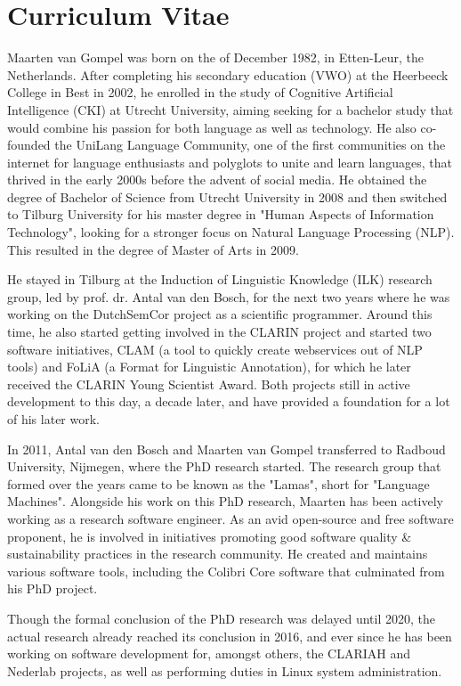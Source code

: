 \chapter*{Curriculum Vitae}

Maarten van Gompel was born on the  of December 1982, in Etten-Leur,
the Netherlands. After completing his secondary education (VWO) at the
Heerbeeck College in Best in 2002, he enrolled in the study of
Cognitive Artificial Intelligence (CKI) at Utrecht University, aiming
seeking for a bachelor study that would combine his
passion for both language as well as technology. He also
co-founded the UniLang Language Community, one of the first communities on the
internet for language enthusiasts and polyglots to unite and learn languages,
that thrived in the early 2000s before the advent of social media. He obtained
the degree of Bachelor of Science from Utrecht University in 2008 and then
switched to Tilburg University for his master degree in "Human Aspects of
Information Technology", looking for a stronger focus on Natural Language
Processing (NLP).  This resulted in the degree of Master of Arts in 2009.

He stayed in Tilburg at the Induction of Linguistic Knowledge (ILK) research
group, led by prof. dr. Antal van den Bosch, for the next two years where he was working on
the DutchSemCor project as a scientific programmer. Around this time, he also
started getting involved in the CLARIN project and started two software
initiatives, CLAM (a tool to quickly create webservices out of NLP tools) and
FoLiA (a Format for Linguistic Annotation), for which he later received the CLARIN Young Scientist Award. Both projects
still in active development to this day, a decade later, and have provided a foundation for a lot of his later work.

In 2011, Antal van den Bosch and Maarten van Gompel transferred to Radboud
University, Nijmegen, where the PhD research started. The research group that
formed over the years came to be known as the "Lamas", short for "Language
Machines".  Alongside his work on this PhD research, Maarten has been actively
working as a research software engineer. As an avid open-source and free
software proponent, he is involved in initiatives promoting good software
quality \& sustainability practices in the research community. He created and
maintains various software tools, including the Colibri Core software that
culminated from his PhD project.

Though the formal conclusion of the PhD research was delayed until 2020, the
actual research already reached its conclusion in 2016, and ever since he has
been working on software development for, amongst others, the CLARIAH and
Nederlab projects, as well as performing duties in Linux system administration.

